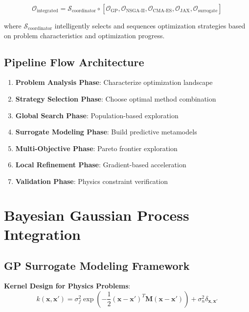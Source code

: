 \documentclass[11pt,a4paper]{article}
\begin{document}
\begin{equation}
\mathcal{O}_{\text{integrated}} = \mathcal{S}_{\text{coordinator}} \circ [\mathcal{O}_{\text{GP}}, \mathcal{O}_{\text{NSGA-II}}, \mathcal{O}_{\text{CMA-ES}}, \mathcal{O}_{\text{JAX}}, \mathcal{O}_{\text{surrogate}}]
\end{equation}

where $\mathcal{S}_{\text{coordinator}}$ intelligently selects and sequences optimization strategies based on problem characteristics and optimization progress.

\subsection{Pipeline Flow Architecture}

\begin{enumerate}
\item \textbf{Problem Analysis Phase}: Characterize optimization landscape
\item \textbf{Strategy Selection Phase}: Choose optimal method combination
\item \textbf{Global Search Phase}: Population-based exploration
\item \textbf{Surrogate Modeling Phase}: Build predictive metamodels
\item \textbf{Multi-Objective Phase}: Pareto frontier exploration
\item \textbf{Local Refinement Phase}: Gradient-based acceleration
\item \textbf{Validation Phase}: Physics constraint verification
\end{enumerate}

\section{Bayesian Gaussian Process Integration}

\subsection{GP Surrogate Modeling Framework}

\textbf{Kernel Design for Physics Problems}:
\begin{equation}
k(\mathbf{x}, \mathbf{x}') = \sigma_f^2 \exp\left(-\frac{1}{2} (\mathbf{x} - \mathbf{x}')^T \mathbf{M} (\mathbf{x} - \mathbf{x}')\right) + \sigma_n^2 \delta_{\mathbf{x}, \mathbf{x}'}
\end{equation}
\end{document}
